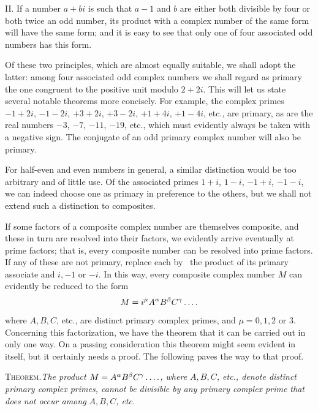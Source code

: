 II. If a number $a+bi$ is such that $a-1$ and $b$ are either both divisible by four or both twice an odd number, its product with a complex number of the same form will have the same form; and it is easy to see that only one of four associated odd numbers has this form.

Of these two principles, which are almost equally suitable, we shall adopt the latter: among four associated odd complex numbers we shall regard as primary the one congruent to the positive unit modulo $2+2i$. This will let us state several notable theorems more concisely. For example, the complex primes $-1+2i$, $-1-2i$, $+3+2i$, $+3-2i$, $+1+4i$, $+1-4i$, etc., are primary, as are the real numbers $-3$, $-7$, $-11$, $-19$, etc., which must evidently always be taken with a negative sign. The conjugate of an odd primary complex number will also be primary.

For half-even and even numbers in general, a similar distinction would be too arbitrary and of little use. Of the associated primes $1+i$, $1-i$, $-1+i$, $-1-i$, we can indeed choose one as primary in preference to the others, but we shall not extend such a distinction to composites.

If some factors of a composite complex number are themselves composite, and these in turn are resolved into their factors, we evidently arrive eventually at prime factors; that is, every composite number can be resolved into prime factors. If any of these are not primary, replace each by\ %
the product of its primary associate and $i,-1$ or $-i$. In this way, every composite complex number $M$ can evidently be reduced to the form
\[
M=i^\mu A^\alpha B^\beta C^\gamma\mathinner{.\,.\,.\,.}
\]
where $A,B,C$, etc., are distinct primary complex primes, and $\mu=0,1,2$ or $3$. Concerning this factorization, we have the theorem that it can be carried out in only one way. On a passing consideration this theorem might seem evident in itself, but it certainly needs a proof. The following paves the way to that proof.

\textsc{Theorem.}\quad\emph{The product $M=A^\alpha B^\beta C^\gamma\mathinner{.\,.\,.\,.}$, where $A,B,C$, etc., denote distinct primary complex primes, cannot be divisible by any primary complex prime that does not occur among $A,B,C$, etc.}

